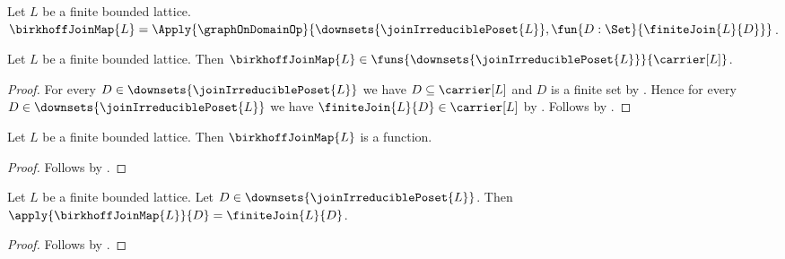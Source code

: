 \begin{definition}\label{birkhoff_join_map}
    Let $L$ be a finite bounded lattice.
    $\birkhoffJoinMap{L}
        =\Apply{\graphOnDomainOp}
            {\downsets{\joinIrreduciblePoset{L}},
             \fun{D:\Set}{\finiteJoin{L}{D}}}$.
\end{definition}

\begin{theorem}\label{birkhoff_join_map_type}
    Let $L$ be a finite bounded lattice.
    Then $\birkhoffJoinMap{L}\in
        \funs{\downsets{\joinIrreduciblePoset{L}}}{\carrier[L]}$.
\end{theorem}
\begin{proof}
    For every $D\in\downsets{\joinIrreduciblePoset{L}}$ we have
        $D\subseteq\carrier[L]$ and $D$ is a finite set by
        .
    Hence for every $D\in\downsets{\joinIrreduciblePoset{L}}$ we have
        $\finiteJoin{L}{D}\in\carrier[L]$ by
        .
    Follows by
        .
\end{proof}

\begin{proposition}\label{birkhoff_join_map_is_function}
    Let $L$ be a finite bounded lattice.
    Then $\birkhoffJoinMap{L}$ is a function.
\end{proposition}
\begin{proof}
    Follows by .
\end{proof}

\begin{proposition}\label{birkhoff_join_map_apply}
    Let $L$ be a finite bounded lattice.
    Let $D\in\downsets{\joinIrreduciblePoset{L}}$.
    Then $\apply{\birkhoffJoinMap{L}}{D}=\finiteJoin{L}{D}$.
\end{proposition}
\begin{proof}
    Follows by
        .
\end{proof}

